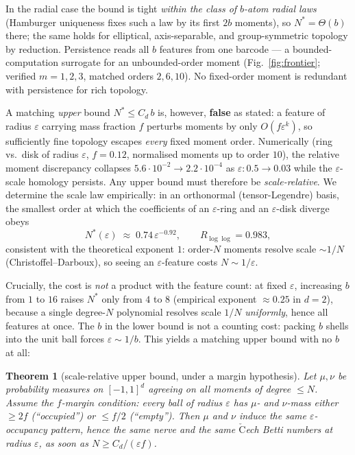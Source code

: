 \documentclass[11pt]{article}
\newtheorem{theorem}{Theorem}
\theoremstyle{remark}
\begin{document}
In the radial case the bound is tight \emph{within the class of $b$-atom radial laws} (Hamburger
uniqueness fixes such a law by its first $2b$ moments), so $N^*=\Theta(b)$ there; the same holds for elliptical, axis-separable, and
group-symmetric topology by reduction. Persistence reads all $b$ features from one barcode --- a
bounded-computation surrogate for an unbounded-order moment (Fig.~\ref{fig:frontier}; verified
$m=1,2,3$, matched orders $2,6,10$). No fixed-order moment is redundant with persistence for rich
topology.

A matching \emph{upper} bound $N^*\le C_d\,b$ is, however, \textbf{false} as stated: a feature of
radius $\varepsilon$ carrying mass fraction $f$ perturbs moments by only $O(f\varepsilon^k)$, so
sufficiently fine topology escapes \emph{every} fixed moment order. Numerically (ring vs.\ disk of
radius $\varepsilon$, $f=0.12$, normalised moments up to order $10$), the relative moment
discrepancy collapses $5.6\!\cdot\!10^{-2}\to 2.2\!\cdot\!10^{-4}$ as $\varepsilon:0.5\to0.03$
while the $\varepsilon$-scale homology persists. Any upper bound must therefore be \emph{scale-relative}. We determine the scale law empirically:
in an orthonormal (tensor-Legendre) basis, the smallest order at which the coefficients of an
$\varepsilon$-ring and an $\varepsilon$-disk diverge obeys
\[
N^*(\varepsilon)\;\approx\;0.74\,\varepsilon^{-0.92},\qquad R_{\log\log}=0.983,
\]
consistent with the theoretical exponent $1$: order-$N$ moments resolve scale $\sim1/N$
(Christoffel--Darboux), so seeing an $\varepsilon$-feature costs $N\sim1/\varepsilon$.

Crucially, the cost is \emph{not} a product with the feature count: at fixed $\varepsilon$,
increasing $b$ from $1$ to $16$ raises $N^*$ only from $4$ to $8$ (empirical exponent $\approx
0.25$ in $d=2$), because a single degree-$N$ polynomial resolves scale $1/N$ \emph{uniformly},
hence all features at once. The $b$ in the lower bound is not a counting cost: packing $b$ shells
into the unit ball forces $\varepsilon\sim1/b$. This yields a matching upper bound with no $b$ at
all:

\begin{theorem}[scale-relative upper bound, under a margin hypothesis]\label{thm:upper}
Let $\mu,\nu$ be probability measures on $[-1,1]^d$ agreeing on all moments of degree $\le N$.
Assume the \emph{$f$-margin condition}: every ball of radius $\varepsilon$ has $\mu$- and
$\nu$-mass either $\ge 2f$ (``occupied'') or $\le f/2$ (``empty''). Then $\mu$ and $\nu$ induce the
same $\varepsilon$-occupancy pattern, hence the same nerve and the same $\check{\mathrm C}$ech
Betti numbers at radius $\varepsilon$, as soon as $N\ge C_d/(\varepsilon f)$.
\end{theorem}
\end{document}

